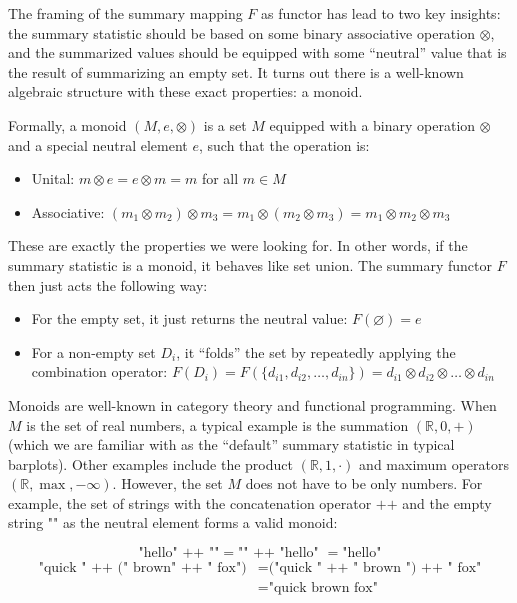 \documentclass[
  openany]{book}
\providecommand{\tightlist}{%
  \setlength{\itemsep}{0pt}\setlength{\parskip}{0pt}}
\theoremstyle{definition}
\theoremstyle{definition}
\theoremstyle{definition}
\theoremstyle{definition}
\theoremstyle{remark}
\begin{document}
The framing of the summary mapping \(F\) as functor has lead to two key insights: the summary statistic should be based on some binary associative operation \(\otimes\), and the summarized values should be equipped with some ``neutral'' value that is the result of summarizing an empty set. It turns out there is a well-known algebraic structure with these exact properties: a monoid.

Formally, a monoid \((M, e, \otimes)\) is a set \(M\) equipped with a binary operation \(\otimes\) and a special neutral element \(e\), such that the operation is:

\begin{itemize}
\tightlist
\item
  Unital: \(m \otimes e = e \otimes m = m\) for all \(m \in M\)
\item
  Associative: \((m_1 \otimes m_2) \otimes m_3 = m_1 \otimes (m_2 \otimes m_3) = m_1 \otimes m_2 \otimes m_3\)
\end{itemize}

These are exactly the properties we were looking for. In other words, if the summary statistic is a monoid, it behaves like set union. The summary functor \(F\) then just acts the following way:

\begin{itemize}
\tightlist
\item
  For the empty set, it just returns the neutral value: \(F(\varnothing) = e\)
\item
  For a non-empty set \(D_i\), it ``folds'' the set by repeatedly applying the combination operator: \(F(D_i) = F(\{d_{i1} , d_{i2}, \ldots, d_{in} \}) = d_{i1} \otimes d_{i2} \otimes \ldots \otimes d_{in}\)
\end{itemize}

Monoids are well-known in category theory and functional programming. When \(M\) is the set of real numbers, a typical example is the summation \((\mathbb{R}, 0, +)\) (which we are familiar with as the ``default'' summary statistic in typical barplots). Other examples include the product \((\mathbb{R}, 1, \cdot)\) and maximum operators \((\mathbb{R}, \max, -\infty)\). However, the set \(M\) does not have to be only numbers. For example, the set of strings with the concatenation operator \(\text{++}\) and the empty string \(\text{""}\) as the neutral element forms a valid monoid:

\[\text{"hello" ++ ""} = \text{"" ++ "hello" } = \text{"hello"} \]
\begin{align}
\text{"quick " ++ (" brown" ++ " fox")} &= \text{("quick " ++ " brown ") ++ " fox"} \\
&= \text{"quick brown fox"}
\end{align}
\end{document}
